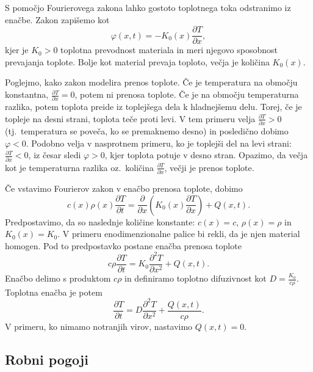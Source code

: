 \documentclass[a4paper,11pt]{article}
\begin{document}
	S pomočjo Fourierovega zakona lahko gostoto toplotnega toka odstranimo iz enačbe. Zakon zapišemo kot
	\begin{equation}
		\varphi(x, t) = -K_0(x) \frac{\partial T}{\partial x},
		\label{eq:fourier1d}
	\end{equation}
	kjer je $K_0 > 0$ toplotna prevodnost materiala in meri njegovo sposobnost prevajanja toplote. Bolje kot material prevaja toploto, večja je količina $K_0(x)$.
	
	Poglejmo, kako zakon modelira prenos toplote. Če je temperatura na območju konstantna, $\frac{\partial T}{\partial x} = 0$, potem ni prenosa toplote. Če je na območju temperaturna razlika, potem toplota preide iz toplejšega dela k hladnejšemu delu. Torej, če je topleje na desni strani, toplota teče proti levi. V tem primeru velja $\frac{\partial T}{\partial x} > 0$ (tj.\ temperatura se poveča, ko se premaknemo desno) in posledično dobimo $\varphi < 0$. Podobno velja v nasprotnem primeru, ko je toplejši del na levi strani: $\frac{\partial T}{\partial x} < 0$, iz česar sledi $\varphi > 0$, kjer toplota potuje v desno stran. Opazimo, da večja kot je temperaturna razlika oz.\ količina $\frac{\partial T}{\partial x}$, večji je prenos toplote.
	
	Če vstavimo Fourierov zakon v enačbo prenosa toplote, dobimo
	\begin{equation}
		c(x)\rho(x) \frac{\partial T}{\partial t} = \frac{\partial}{\partial x}\left(K_0(x) \frac{\partial T}{\partial x}\right) + Q(x, t).
	\end{equation}
	Predpostavimo, da so naslednje količine konstante: $c(x) = c$, $\rho(x) = \rho$ in $K_0(x) = K_0$. V primeru enodimenzionalne palice bi rekli, da je njen material homogen. Pod to predpostavko postane enačba prenosa toplote
	\begin{equation}
		c\rho \frac{\partial T}{\partial t} = K_0 \frac{\partial^2 T}{\partial x^2} + Q(x, t).
		\label{eq:eq3}
	\end{equation}
	Enačbo delimo s produktom $c\rho$ in definiramo toplotno difuzivnost kot $D = \frac{K_0}{c\rho}$. Toplotna enačba je potem
	\begin{equation}
		\frac{\partial T}{\partial t} = D \frac{\partial^2 T}{\partial x^2} + \frac{Q(x, t)}{c\rho}.
		\label{eq:eq4}
	\end{equation}
	V primeru, ko nimamo notranjih virov, nastavimo $Q(x, t) = 0$.
	
	\subsection{Robni pogoji}
	
\end{document}

